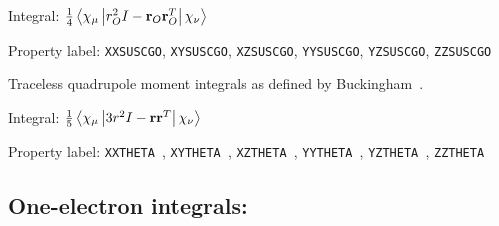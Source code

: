 \begin{description}
\begin{list}{}{}
\item Integral: $\frac{1}{4}\left<\chi_{\mu}\left|r^{2}_{O}I - {\bf r}_{O}
{\bf r}_{O}^{T}\right|\chi_{\nu}\right>$
\item Property label: \verb|XXSUSCGO|, \verb|XYSUSCGO|,
\verb|XZSUSCGO|, \verb|YYSUSCGO|, \verb|YZSUSCGO|, \verb|ZZSUSCGO|
\end{list}

\item[\Key{THETA}] Traceless quadrupole moment integrals as defined by Buckingham~\cite{adbacp12}.

\begin{list}{}{}
\item Integral: $\frac{1}{5}\left<\chi_{\mu}\left|3r^{2}I - {\bf r}
{\bf r}^{T}\right|\chi_{\nu}\right>$
\item Property label: \verb|XXTHETA |, \verb|XYTHETA |,
\verb|XZTHETA |, \verb|YYTHETA |, \verb|YZTHETA |, \verb|ZZTHETA |
\end{list}

\end{description}

\subsection{One-electron integrals: }

